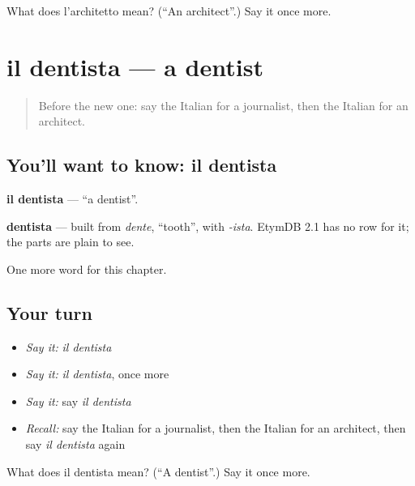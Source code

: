 \begin{tcolorbox}[breakable,colback=teal!4,colframe=teal!35!black,title={Before you move on}]
What does l'architetto mean? (\textquotedblleft{}An architect\textquotedblright{}.) Say it once more.
\end{tcolorbox}
\section[il dentista]{il dentista — a dentist}

\label{lesson:IT-C250-dentista}



\begin{quote}
Before the new one: say the Italian for a journalist, then the Italian for an architect.
\end{quote}

\subsection*{You'll want to know: il dentista}
\textbf{il dentista} — \textquotedblleft{}a dentist\textquotedblright{}.

\begin{cousinweb}
\textbf{dentista} — built from \emph{dente}, \textquotedblleft{}tooth\textquotedblright{}, with \emph{-ista}. EtymDB 2.1 has no row for it; the parts are plain to see.
\end{cousinweb}

\begin{grammarlens}[title={What you've built}]
One more word for this chapter.
\end{grammarlens}

\subsection*{Your turn}
\begin{itemize}
\raggedright
  \item \emph{Say it:} \emph{il dentista}
  \item \emph{Say it:} \emph{il dentista}, once more
  \item \emph{Say it:} say \emph{il dentista}
  \item \emph{Recall:} say the Italian for a journalist, then the Italian for an architect, then say \emph{il dentista} again
\end{itemize}

\begin{tcolorbox}[breakable,colback=teal!4,colframe=teal!35!black,title={Before you move on}]
What does il dentista mean? (\textquotedblleft{}A dentist\textquotedblright{}.) Say it once more.
\end{tcolorbox}
